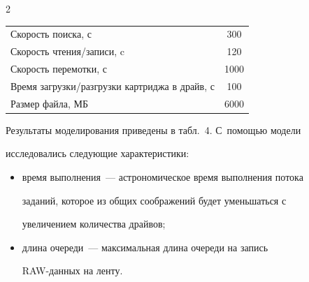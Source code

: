 \begin{multicols}{2}
\begin{table}
\begin{center}
\begin{tabular}{|l|c|}
Скорость поиска, с&\hphantom{9}300\\


Скорость чтения/записи, c&\hphantom{9}120\\


Скорость перемотки, с&1000\\


Время загрузки/разгрузки картриджа в драйв, с&\hphantom{9}100\\


Размер файла, МБ&6000\\


\hline


\end{tabular}


\end{center}


\vspace*{-9pt}


\end{table}





   Результаты моделирования приведены в табл.~4. С~помощью модели 


исследовались следующие характеристики: 


   \begin{itemize}


\item время выполнения~--- астрономическое время выполнения потока 


заданий, которое из общих соображений будет уменьшаться с 


увеличением количества драйвов;


\item длина очереди~--- максимальная длина очереди на запись 


RAW-дан\-ных на ленту. 


\end{itemize}





\begin{table}\small %


\begin{center}




\vspace*{2ex}





\begin{tabular}{|c|c|c|c|c|}



\end{tabular}
\end{center}
\end{table}
\end{multicols}
